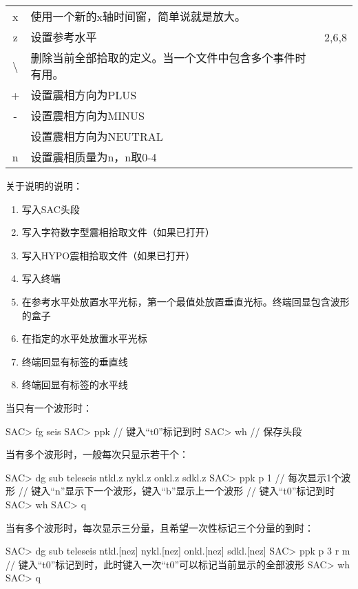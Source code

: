 \begin{table}[H]
\begin{tabular}{cll}
    x	    &	使用一个新的x轴时间窗，简单说就是放大。 &           \\
    z	    &	设置参考水平                            &   2,6,8	\\
    \textbackslash	    &	删除当前全部拾取的定义。当一个文件中包含多个事件时有用。&	\\
    +	    &	设置震相方向为PLUS	                    &           \\
    -	    &	设置震相方向为MINUS	                    &           \\
    \lstinline[showspaces]{ }   &	设置震相方向为NEUTRAL	                &           \\
    n	    &	设置震相质量为n，n取0-4	                &           \\
	\bottomrule
\end{tabular}
\end{table}

关于说明的说明：
\begin{enumerate}
\item 写入SAC头段
\item 写入字符数字型震相拾取文件（如果已打开）
\item 写入HYPO震相拾取文件（如果已打开）
\item 写入终端
\item 在参考水平处放置水平光标，第一个最值处放置垂直光标。终端回显包含波形的盒子
\item 在指定的水平处放置水平光标
\item 终端回显有标签的垂直线
\item 终端回显有标签的水平线
\end{enumerate}

当只有一个波形时：
\begin{SACCode}
SAC> fg seis
SAC> ppk
// 键入``t0''标记到时
SAC> wh         // 保存头段
\end{SACCode}

当有多个波形时，一般每次只显示若干个：
\begin{SACCode}
SAC> dg sub teleseis ntkl.z nykl.z onkl.z sdkl.z
SAC> ppk p 1    // 每次显示1个波形
// 键入``n''显示下一个波形，键入``b''显示上一个波形
// 键入``t0''标记到时
SAC> wh
SAC> q
\end{SACCode}

当有多个波形时，每次显示三分量，且希望一次性标记三个分量的到时：
\begin{SACCode}
SAC> dg sub teleseis ntkl.[nez] nykl.[nez] onkl.[nez] sdkl.[nez]
SAC> ppk p 3 r m
// 键入``t0''标记到时，此时键入一次``t0''可以标记当前显示的全部波形
SAC> wh
SAC> q
\end{SACCode}
